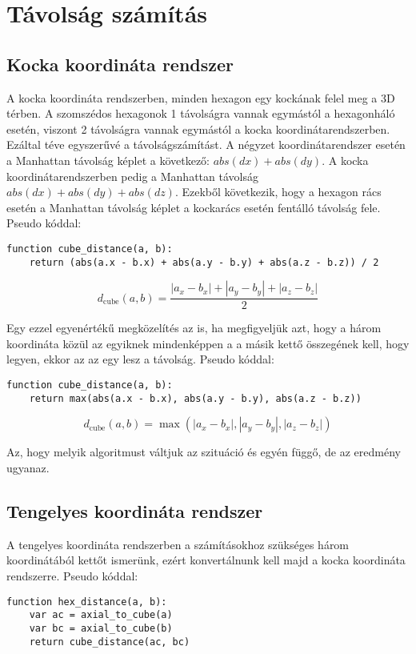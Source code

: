 \chapter{Távolság számítás}

\section{Kocka koordináta rendszer}

A kocka koordináta rendszerben, minden hexagon egy kockának felel meg a 3D térben. A szomszédos hexagonok 1 távolságra vannak egymástól a hexagonháló esetén, viszont 2 távolságra vannak egymástól a kocka koordinátarendszerben. Ezáltal téve egyszerűvé a távolságszámítást. A négyzet koordinátarendszer esetén a Manhattan távolság képlet a következő: $abs(dx) + abs(dy)$. A kocka koordinátarendszerben pedig a Manhattan távolság $abs(dx) + abs(dy) + abs(dz)$. Ezekből következik, hogy a hexagon rács esetén a Manhattan távolság képlet a kockarács esetén fentálló távolság fele.
\newline
\newline Pseudo kóddal:
\begin{verbatim}
function cube_distance(a, b):
    return (abs(a.x - b.x) + abs(a.y - b.y) + abs(a.z - b.z)) / 2
\end{verbatim}    

$$
d_{\text{cube}}(a, b) =
\dfrac{|a_x - b_x| + |a_y - b_y| + |a_z - b_z|}{2}
$$

\noindent Egy ezzel egyenértékű megközelítés az is, ha megfigyeljük azt, hogy a három koordináta közül az egyiknek mindenképpen a a másik kettő összegének kell, hogy legyen, ekkor az az egy lesz a távolság. 
\newline
\newline Pseudo kóddal:
\begin{verbatim}
function cube_distance(a, b):
    return max(abs(a.x - b.x), abs(a.y - b.y), abs(a.z - b.z))
\end{verbatim}

$$
d_{\text{cube}}(a, b) =
\max(
|a_x - b_x|, |a_y - b_y|, |a_z - b_z|
)
$$

\noindent Az, hogy melyik algoritmust váltjuk az szituáció és egyén függő, de az eredmény ugyanaz.

\section{Tengelyes koordináta rendszer}

A tengelyes koordináta rendszerben a számításokhoz szükséges három koordinátából kettőt ismerünk, ezért konvertálnunk kell majd a kocka koordináta rendszerre.
\newline
\newline Pseudo kóddal:
\begin{verbatim}
function hex_distance(a, b):
    var ac = axial_to_cube(a)
    var bc = axial_to_cube(b)
    return cube_distance(ac, bc)
\end{verbatim}    

